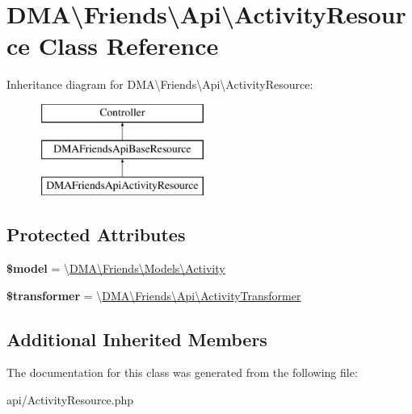 \hypertarget{classDMA_1_1Friends_1_1Api_1_1ActivityResource}{}\section{D\+M\+A\textbackslash{}Friends\textbackslash{}Api\textbackslash{}Activity\+Resource Class Reference}
\label{classDMA_1_1Friends_1_1Api_1_1ActivityResource}
Inheritance diagram for D\+M\+A\textbackslash{}Friends\textbackslash{}Api\textbackslash{}Activity\+Resource\+:\begin{figure}[H]
\begin{center}
\leavevmode
\includegraphics[height=3.000000cm]{d7/d53/classDMA_1_1Friends_1_1Api_1_1ActivityResource}
\end{center}
\end{figure}
\subsection*{Protected Attributes}
\begin{DoxyCompactItemize}
\item 
\hypertarget{classDMA_1_1Friends_1_1Api_1_1ActivityResource_a242d36374707954a784f08931e1796d9}{}{\bfseries \$model} = \textquotesingle{}\textbackslash{}\hyperlink{classDMA_1_1Friends_1_1Models_1_1Activity}{D\+M\+A\textbackslash{}\+Friends\textbackslash{}\+Models\textbackslash{}\+Activity}\textquotesingle{}\label{classDMA_1_1Friends_1_1Api_1_1ActivityResource_a242d36374707954a784f08931e1796d9}

\item 
\hypertarget{classDMA_1_1Friends_1_1Api_1_1ActivityResource_ab46a991a9e3980e6864c2c98c4fefe3a}{}{\bfseries \$transformer} = \textquotesingle{}\textbackslash{}\hyperlink{classDMA_1_1Friends_1_1Api_1_1ActivityTransformer}{D\+M\+A\textbackslash{}\+Friends\textbackslash{}\+Api\textbackslash{}\+Activity\+Transformer}\textquotesingle{}\label{classDMA_1_1Friends_1_1Api_1_1ActivityResource_ab46a991a9e3980e6864c2c98c4fefe3a}

\end{DoxyCompactItemize}
\subsection*{Additional Inherited Members}


The documentation for this class was generated from the following file\+:\begin{DoxyCompactItemize}
\item 
api/Activity\+Resource.\+php\end{DoxyCompactItemize}
